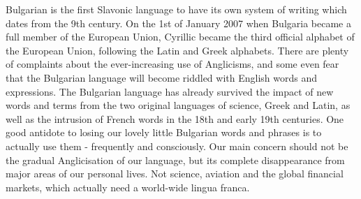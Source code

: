 \begin{multicols}{2}
Bulgarian is the first Slavonic language to have its own system of writing which dates from the 9th century. On the 1st of January 2007 when Bulgaria became a full member of the European Union, Cyrillic became the third official alphabet of the European Union, following the Latin and Greek alphabets. 
There are plenty of complaints about the ever-increasing use of Anglicisms, and some even fear that the Bulgarian language will become riddled with English words and expressions. The Bulgarian language has already survived the impact of new words and terms from the two original languages of science, Greek and Latin, as well as the intrusion of French words in the 18th and early 19th centuries. One good antidote to losing our lovely little Bulgarian words and phrases is to actually use them - frequently and consciously. Our main concern should not be the gradual Anglicisation of our language, but its complete disappearance from major areas of our personal lives. Not science, aviation and the global financial markets, which actually need a world-wide lingua franca.


\end{multicols}
